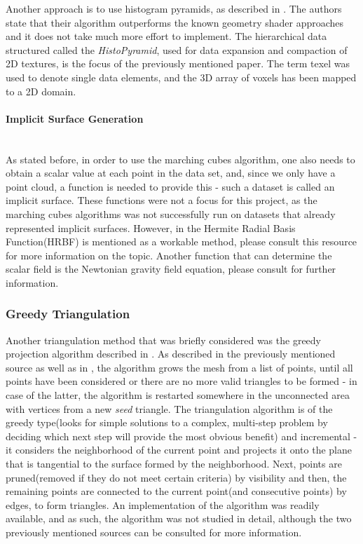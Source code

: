 \documentclass[]{article}
\begin{document}
Another approach is to use histogram pyramids, as described in \cite{dyken2007}. The authors state that their algorithm outperforms the known geometry shader approaches and it does not take much more effort to implement. The hierarchical data structured called the \textit{HistoPyramid}, used for data expansion and compaction of 2D textures, is the focus of the previously mentioned paper. The term texel was used to denote single data elements, and the 3D array of voxels has been mapped to a 2D domain.


\paragraph{Implicit Surface Generation}\mbox{}\\

As stated before, in order to use the marching cubes algorithm, one also needs to obtain a scalar value at each point in the data set, and, since we only have a point cloud, a function is needed to provide this - such a dataset is called an implicit surface. These functions were not a focus for this project, as the marching cubes algorithms was not successfully run on datasets that already represented implicit surfaces. However, in \cite{navpreet2013} the Hermite Radial Basis Function(HRBF) is mentioned as a workable method, please consult this resource for more information on the topic. Another function that can determine the scalar field is the Newtonian gravity field equation, please consult \cite{max2013} for further information.

\subsubsection{Greedy Triangulation}

Another triangulation method that was briefly considered was the greedy projection algorithm described in \cite{Marton09ICRA}. As described in the previously mentioned source as well as in \cite{navpreet2013}, the algorithm grows the mesh from a list of points, until all points have been considered or there are no more valid triangles to be formed - in case of the latter, the algorithm is restarted somewhere in the unconnected area with vertices from a new \textit{seed} triangle. The triangulation algorithm is of the greedy type(looks for simple solutions to a complex, multi-step problem by deciding which next step will provide the most obvious benefit) and incremental - it considers the neighborhood of the current point and projects it onto the plane that is tangential to the surface formed by the neighborhood. Next, points are pruned(removed if they do not meet certain criteria) by visibility and then, the remaining points are connected to the current point(and consecutive points) by edges, to form triangles. An implementation of the algorithm was readily available, and as such, the algorithm was not studied in detail, although the two previously mentioned sources can be consulted for more information.
\end{document}
